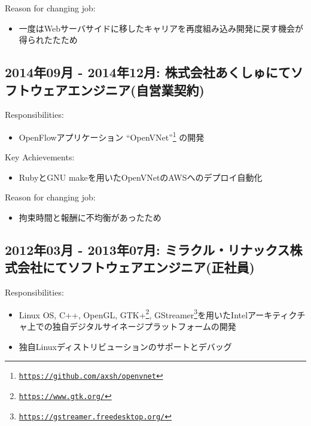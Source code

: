 \documentclass[letterpaper]{article}
\begin{document}
\noindent Reason for changing job:

\begin{itemize}
  \item 一度はWebサーバサイドに移したキャリアを再度組み込み開発に戻す機会が得られたたため
\end{itemize}

\subsection*{2014年09月 - 2014年12月: 株式会社あくしゅにてソフトウェアエンジニア(自営業契約)}

\noindent Responsibilities:

\begin{itemize}
  \item OpenFlowアプリケーション ``OpenVNet''\footnote{\href{https://github.com/axsh/openvnet}{\tt https://github.com/axsh/openvnet}} の開発
\end{itemize}

\noindent Key Achievements:

\begin{itemize}
  \item RubyとGNU makeを用いたOpenVNetのAWSへのデプロイ自動化
\end{itemize}

\noindent Reason for changing job:

\begin{itemize}
  \item 拘束時間と報酬に不均衡があったため
\end{itemize}

\subsection*{2012年03月 - 2013年07月: ミラクル・リナックス株式会社にてソフトウェアエンジニア(正社員)}

\noindent Responsibilities:

\begin{itemize}
  \item Linux OS, C++, OpenGL, GTK+\footnote{\href{https://www.gtk.org/}{\tt https://www.gtk.org/}}, GStreamer\footnote{\href{https://gstreamer.freedesktop.org/}{\tt https://gstreamer.freedesktop.org/}}を用いたIntelアーキティクチャ上での独自デジタルサイネージプラットフォームの開発
  \item 独自Linuxディストリビューションのサポートとデバッグ
\end{itemize}
\end{document}
